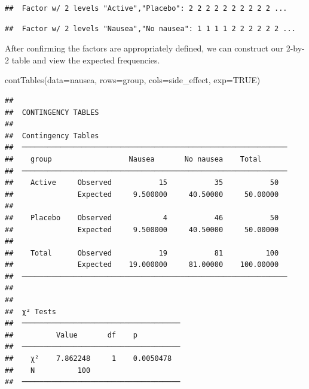 \documentclass[
]{memoir}
\newenvironment{Shaded}{\begin{snugshade}}{\end{snugshade}}
\newcommand{\AttributeTok}[1]{\textcolor[rgb]{0.77,0.63,0.00}{#1}}
\newcommand{\ConstantTok}[1]{\textcolor[rgb]{0.00,0.00,0.00}{#1}}
\newcommand{\FunctionTok}[1]{\textcolor[rgb]{0.00,0.00,0.00}{#1}}
\newcommand{\NormalTok}[1]{#1}
\newcommand{\SpecialCharTok}[1]{\textcolor[rgb]{0.00,0.00,0.00}{#1}}
\begin{document}
\begin{verbatim}
##  Factor w/ 2 levels "Active","Placebo": 2 2 2 2 2 2 2 2 2 2 ...
\end{verbatim}

\begin{Shaded}
\end{Shaded}

\begin{verbatim}
##  Factor w/ 2 levels "Nausea","No nausea": 1 1 1 1 2 2 2 2 2 2 ...
\end{verbatim}

After confirming the factors are appropriately defined, we can construct our 2-by-2 table and view the expected frequencies.

\begin{Shaded}
\begin{Highlighting}[]
\FunctionTok{contTables}\NormalTok{(}\AttributeTok{data=}\NormalTok{nausea,}
           \AttributeTok{rows=}\NormalTok{group, }\AttributeTok{cols=}\NormalTok{side\_effect,}
           \AttributeTok{exp=}\ConstantTok{TRUE}\NormalTok{)}
\end{Highlighting}
\end{Shaded}

\begin{verbatim}
## 
##  CONTINGENCY TABLES
## 
##  Contingency Tables                                             
##  ────────────────────────────────────────────────────────────── 
##    group                  Nausea       No nausea    Total       
##  ────────────────────────────────────────────────────────────── 
##    Active     Observed           15           35           50   
##               Expected     9.500000     40.50000     50.00000   
##                                                                 
##    Placebo    Observed            4           46           50   
##               Expected     9.500000     40.50000     50.00000   
##                                                                 
##    Total      Observed           19           81          100   
##               Expected    19.000000     81.00000    100.00000   
##  ────────────────────────────────────────────────────────────── 
## 
## 
##  χ² Tests                              
##  ───────────────────────────────────── 
##          Value       df    p           
##  ───────────────────────────────────── 
##    χ²    7.862248     1    0.0050478   
##    N          100                      
##  ─────────────────────────────────────
\end{verbatim}
\end{document}
